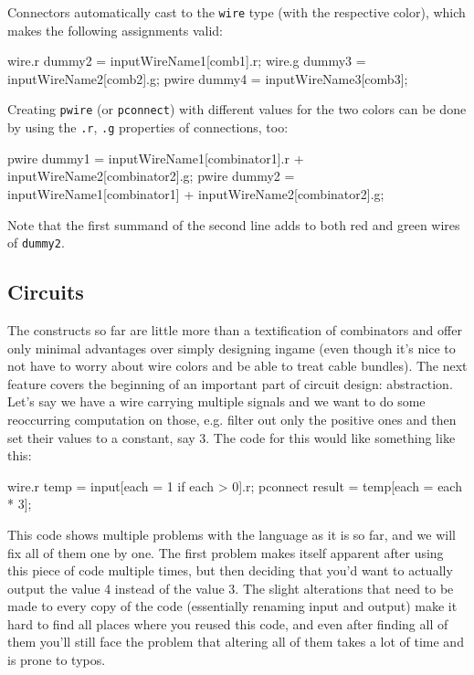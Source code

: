 \documentclass[landscape]{article}
\theoremstyle{plain}
\theoremstyle{definition}
\begin{document}
Connectors automatically cast to the \texttt{wire} type (with the respective color), which makes the following assignments valid:
\begin{langname}
wire.r dummy2 = inputWireName1[comb1].r;
wire.g dummy3 = inputWireName2[comb2].g;
pwire dummy4 = inputWireName3[comb3];
\end{langname}
Creating \texttt{pwire} (or \texttt{pconnect}) with different values for the two colors can be done by using the \texttt{.r}, \texttt{.g} properties of connections, too:
\begin{langname}
pwire dummy1 = inputWireName1[combinator1].r + inputWireName2[combinator2].g;
pwire dummy2 = inputWireName1[combinator1] + inputWireName2[combinator2].g;
\end{langname}
Note that the first summand of the second line adds to both red and green wires of \texttt{dummy2}.
\subsection{Circuits}
The constructs so far are little more than a textification of combinators and offer only minimal advantages over simply designing ingame (even though it's nice to not have to worry about wire colors and be able to treat cable bundles). The next feature covers the beginning of an important part of circuit design: abstraction. Let's say we have a wire carrying multiple signals and we want to do some reoccurring computation on those, e.g. filter out only the positive ones and then set their values to a constant, say 3. The code for this would like something like this:
\begin{langname}
wire.r temp = input[each = 1 if each > 0].r;
pconnect result = temp[each = each * 3];
\end{langname}
This code shows multiple problems with the language as it is so far, and we will fix all of them one by one. The first problem makes itself apparent after using this piece of code multiple times, but then deciding that you'd want to actually output the value 4 instead of the value 3. The slight alterations that need to be made to every copy of the code (essentially renaming input and output) make it hard to find all places where you reused this code, and even after finding all of them you'll still face the problem that altering all of them takes a lot of time and is prone to typos.
\end{document}
